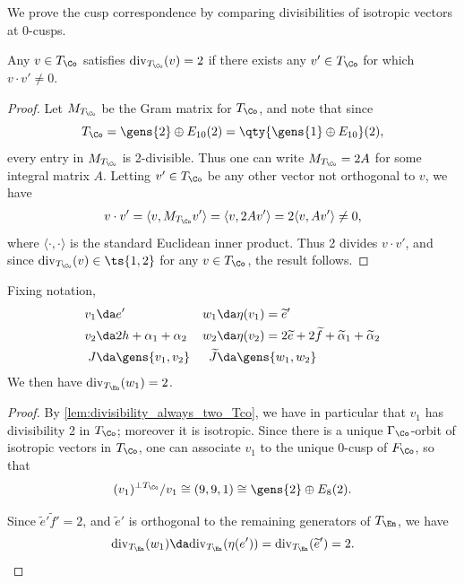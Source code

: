 \documentclass[../main.tex]{subfiles}
\begin{document}
We prove the cusp correspondence by comparing divisibilities of isotropic vectors at 0-cusps.

\begin{lemma}\label{lem:divisibility_always_two_Tco}
Any $v\in T_\Co$ satisfies $\mathrm{div}_{T_\Co}(v) = 2$ if there exists any $v'\in T_\Co$ for which $v\cdot v' \neq 0$. 
\end{lemma}
\begin{proof}
Let $M_{T_\Co}$ be the Gram matrix for $T_\Co$, and note that since 
\[
T_\Co = \gens{2} \oplus E_{10}(2) = \qty{\gens{1} \oplus E_{10}}(2)
,\]
every entry in $M_{T_\Co}$ is 2-divisible. Thus one can write $M_{T_\Co} = 2A$ for some integral matrix $A$. Letting $v' \in T_\Co$ be any other vector not orthogonal to $v$, we have
    \begin{align*}
        v\cdot v' = \langle v, M_{T_\Co}v' \rangle = \langle v, 2 Av' \rangle 
        = 2\langle v, Av' \rangle \neq 0
    ,\end{align*}
    where $\langle \cdot, \cdot\rangle$ is the standard Euclidean inner product. Thus 2 divides $v\cdot v'$, and since $\mathrm{div}_{T_\Co}(v) \in \ts{1, 2}$ for any $v \in T_\Co$, the result follows.
\end{proof}

\begin{lemma}\label{lem:divisibility_Tco_one}
Fixing notation,
\begin{align*}
    v_1 &\da e' & w_1 &\da \eta(v_1) = \tilde e' \\
    v_2 &\da 2h + \alpha_1 + \alpha_2 & w_2 &\da \eta(v_2) = 2\tilde e + 2\tilde f + \tilde\alpha_1 + \tilde\alpha_2 \\
    J &\da \gens{v_1, v_2} & \tilde J &\da \gens{w_1, w_2}
\end{align*}
We then have $\mathrm{div}_{T_\En}(w_1) = 2$.
\end{lemma}

\begin{proof}
By \cref{lem:divisibility_always_two_Tco}, we have in particular that $v_1$ has divisibility 2 in $T_\Co$; moreover it is isotropic. Since there is a unique $\Gamma_\Co$-orbit of isotropic vectors in $T_\Co$, one can associate $v_1$ to the unique 0-cusp of $F_\Co$, so that 
\[
(v_1)^{\perp T_\Co}/v_1 \cong (9,9,1) \cong \gens{2} \oplus E_8(2)
.\]


Since $\tilde e' \tilde f' = 2$, and $\tilde e'$ is orthogonal to the remaining generators of $T_\En$, we have 
\[
\mathrm{div}_{T_\En}(w_1) \da \mathrm{div}_{T_\En}(\eta(e'))  
 = \mathrm{div}_{T_\En}(\tilde e') = 2
.\]
\end{proof}
\end{document}
